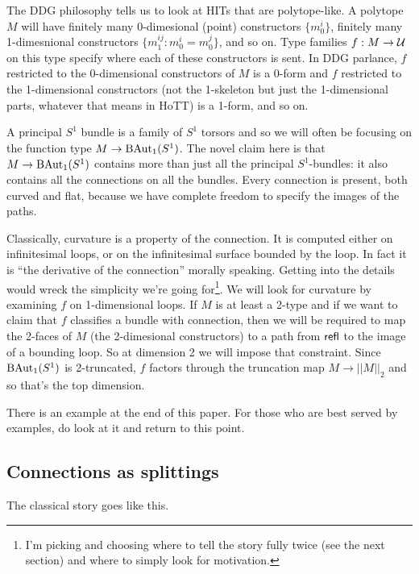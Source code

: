 The DDG philosophy tells us to look at HITs that are polytope-like. A polytope \( M \) will have finitely many 0-dimesional (point) constructors \( \{m_0^i\} \), finitely many 1-dimesnional constructors \( \{m_1^{ij}:m_0^i=m_0^j\} \), and so on. Type families \( f:M\to \mathcal{U} \) on this type specify where each of these constructors is sent. In DDG parlance, \( f \) restricted to the 0-dimensional constructors of \( M \) is a 0-form and \( f \) restricted to the 1-dimensional constructors (not the 1-skeleton but just the 1-dimensional parts, whatever that means in HoTT) is a 1-form, and so on.

A principal \( S^1 \) bundle is a family of \( S^1 \) torsors and so we will often be focusing on the function type \( M\to \mathrm{BAut}_1(S^1) \). The novel claim here is that \( M\to \mathrm{BAut}_1(S^1) \) contains more than just all the principal \( S^1 \)-bundles: it also contains all the connections on all the bundles. Every connection is present, both curved and flat, because we have complete freedom to specify the images of the paths.

Classically, curvature is a property of the connection. It is computed either on infinitesimal loops, or on the infinitesimal surface bounded by the loop. In fact it is ``the derivative of the connection'' morally speaking. Getting into the details would wreck the simplicity we're going for\footnote{I'm picking and choosing where to tell the story fully twice (see the next section) and where to simply look for motivation.}. We will look for curvature by examining \( f \) on 1-dimensional loops. If \( M \) is at least a 2-type and if we want to claim that \( f \) classifies a bundle with connection, then we will be required to map the 2-faces of \( M \) (the 2-dimesional constructors) to a path from \( \mathsf{refl} \) to the image of a bounding loop. So at dimension 2 we will impose that constraint. Since \( \mathrm{BAut}_1(S^1) \) is 2-truncated, \( f \) factors through the truncation map \( M\to||M||_2 \) and so that's the top dimension.

There is an example at the end of this paper. For those who are best served by examples, do look at it and return to this point.



\subsection{Connections as splittings}

The classical story goes like this.

